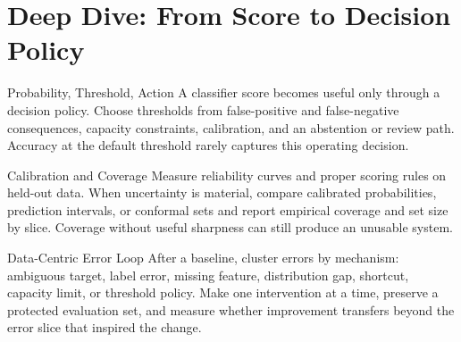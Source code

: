 \section{Deep Dive: From Score to Decision Policy}
\begin{v3topic}{Probability, Threshold, Action}
A classifier score becomes useful only through a decision policy.
Choose thresholds from false-positive and false-negative consequences,
capacity constraints, calibration, and an abstention or review path.
Accuracy at the default threshold rarely captures this operating decision.

\end{v3topic}
\begin{v3topic}{Calibration and Coverage}
Measure reliability curves and proper scoring rules on held-out data.
When uncertainty is material, compare calibrated probabilities, prediction
intervals, or conformal sets and report empirical coverage and set size by
slice.
Coverage without useful sharpness can still produce an unusable system.

\end{v3topic}
\begin{v3topic}{Data-Centric Error Loop}
After a baseline, cluster errors by mechanism: ambiguous target, label error,
missing feature, distribution gap, shortcut, capacity limit, or threshold
policy.
Make one intervention at a time, preserve a protected evaluation set, and
measure whether improvement transfers beyond the error slice that inspired the
change.
\end{v3topic}

